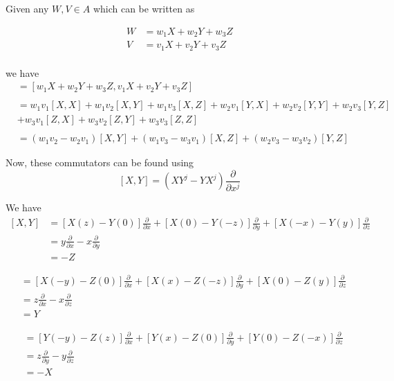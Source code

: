 \documentclass{article}
\begin{document}
\vskip 0.5cm
Given any $W, V \in A$ which can be written as 

\begin{align*}
  W &= w_1 X + w_2 Y + w_3 Z \\
  V &= v_1 X + v_2 Y + v_3 Z \\
\end{align*}

we have 
\begin{align*}
  [W, V] &= \left[w_1 X + w_2 Y + w_3 Z, v_1 X + v_2 Y + v_3 Z\right] \\
  \\
  &= w_1 v_1[X, X] + w_1v_2[X, Y] + w_1 v_3 [X, Z] 
  + w_2 v_1[Y, X] + w_2 v_2[Y, Y] + w_2 v_3 [Y, Z] \\
  &+ w_3 v_1[Z, X] + w_3 v_2[Z, Y] + w_3 v_3 [Z, Z] \\
  \\
  &= \left(w_1v_2 - w_2v_1\right) [X, Y] + \left( w_1v_3 - w_3 v_1 \right)[X, Z] + \left(w_2v_3 - w_3v_2\right)[Y, Z] 
\end{align*}

Now, these commutators can be found using 
\[ [X, Y] = \left(XY^j - YX^j\right) \frac{\partial}{\partial x^j} \] 

We have 
\begin{align*}
  \left[X, Y\right] &= \left[ X(z) - Y(0) \right] \frac{\partial}{\partial x} + \left[ X(0) - Y(-z) \right] \frac{\partial}{\partial y} + \left[ X(-x) - Y(y) \right] \frac{\partial}{\partial z} \\
  &= y \frac{\partial}{\partial x} -x \frac{\partial}{\partial y} \\
  &=  -Z
\end{align*}

\begin{align*}
  [X, Z] &= \left[ X(-y) - Z(0) \right] \frac{\partial}{\partial x} + \left[ X(x) - Z(-z) \right] \frac{\partial}{\partial y} + \left[ X(0) - Z(y) \right] \frac{\partial}{\partial z} \\
  &= z \frac{\partial}{\partial x} - x \frac{\partial}{\partial z} \\
  &= Y
\end{align*}

\begin{align*}
  [Y, Z] &= \left[ Y(-y) - Z(z) \right] \frac{\partial}{\partial x} + \left[ Y(x) - Z(0) \right] \frac{\partial}{\partial y} + \left[ Y(0) - Z(-x) \right] \frac{\partial}{\partial z} \\
  &= z \frac{\partial}{\partial y} - y\frac{\partial}{\partial z} \\
  &= -X
\end{align*}
\end{document}
